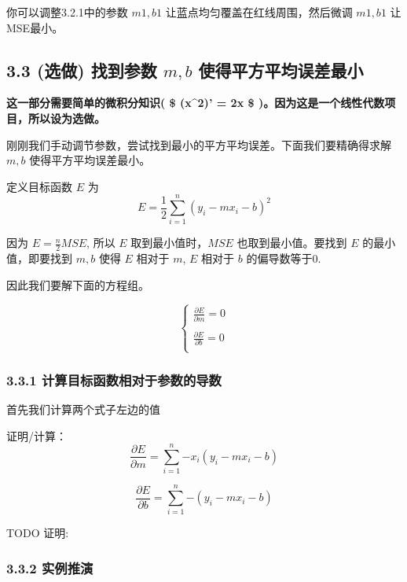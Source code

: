 \documentclass[11pt]{article}
\begin{document}
你可以调整3.2.1中的参数 \(m1,b1\) 让蓝点均匀覆盖在红线周围，然后微调
\(m1, b1\) 让MSE最小。

    \subsection{\texorpdfstring{3.3 (选做) 找到参数 \(m, b\)
使得平方平均误差最小}{3.3 (选做) 找到参数 m, b 使得平方平均误差最小}}\label{ux9009ux505a-ux627eux5230ux53c2ux6570-m-b-ux4f7fux5f97ux5e73ux65b9ux5e73ux5747ux8befux5deeux6700ux5c0f}

\textbf{这一部分需要简单的微积分知识( \$ (x\^{}2)' = 2x \$
)。因为这是一个线性代数项目，所以设为选做。}

刚刚我们手动调节参数，尝试找到最小的平方平均误差。下面我们要精确得求解
\(m, b\) 使得平方平均误差最小。

定义目标函数 \(E\) 为 \[
E = \frac{1}{2}\sum_{i=1}^{n}{(y_i - mx_i - b)^2}
\]

因为 \(E = \frac{n}{2}MSE\), 所以 \(E\) 取到最小值时，\(MSE\)
也取到最小值。要找到 \(E\) 的最小值，即要找到 \(m, b\) 使得 \(E\) 相对于
\(m\), \(E\) 相对于 \(b\) 的偏导数等于0.

因此我们要解下面的方程组。

\[
\begin{cases}
\displaystyle
\frac{\partial E}{\partial m} =0 \\
\\
\displaystyle
\frac{\partial E}{\partial b} =0 \\
\end{cases}
\]

\subsubsection{3.3.1
计算目标函数相对于参数的导数}\label{ux8ba1ux7b97ux76eeux6807ux51fdux6570ux76f8ux5bf9ux4e8eux53c2ux6570ux7684ux5bfcux6570}

首先我们计算两个式子左边的值

证明/计算： \[
\frac{\partial E}{\partial m} = \sum_{i=1}^{n}{-x_i(y_i - mx_i - b)}
\]

\[
\frac{\partial E}{\partial b} = \sum_{i=1}^{n}{-(y_i - mx_i - b)}
\]

    TODO 证明:

    \subsubsection{3.3.2 实例推演}\label{ux5b9eux4f8bux63a8ux6f14}
\end{document}

